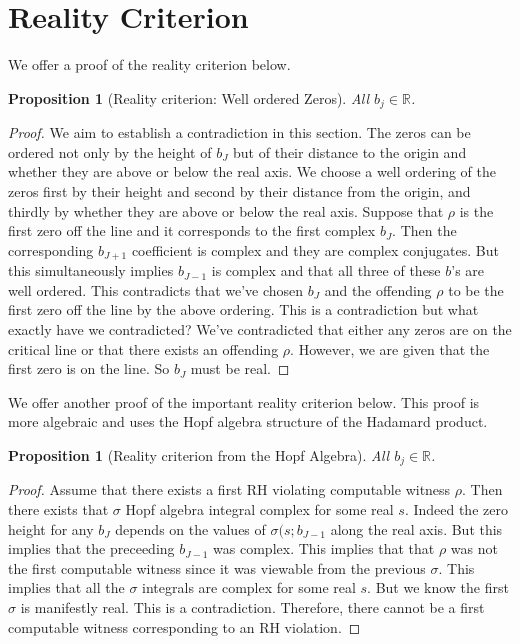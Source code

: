 \documentclass[12pt]{article}
\theoremstyle{plain}
\newtheorem{proposition}[theorem]{Proposition}
\theoremstyle{definition}
\newcommand{\R}{\mathbb{R}}
\begin{document}
\section{Reality Criterion}\label{sec:reality}
We offer a proof of the reality criterion below.
\begin{proposition}[Reality criterion: Well ordered Zeros]\label{prop:well-ordered}
  All $b_j \in \R$.
\end{proposition}
\begin{proof}
  We aim to establish a contradiction in this section. The zeros can be ordered not only by the height of $b_J$ but of their distance to the origin and whether they are above or below the real axis. We choose a well ordering of the zeros first by their height and second by their distance from the origin, and thirdly by whether they are above or below the real axis. 
  Suppose that $\rho$ is the first zero off the line and it corresponds to the first complex $b_J$. Then the corresponding $b_{J+1}$ coefficient is complex and they are complex conjugates. But this simultaneously implies $b_{J-1}$ is complex and that all three of these $b$'s are well ordered. 
  This contradicts that we've chosen $b_J$ and the offending $\rho$ to be the first zero off the line by the above ordering. This is a contradiction but what exactly have we contradicted? We've contradicted that either any zeros are on the critical line or that there exists an offending $\rho$.
  However, we are given that the first zero is on the line. So $b_J$ must be real.
\end{proof}
We offer another proof of the important reality criterion below. This proof is more algebraic and uses the Hopf algebra structure of the Hadamard product.
\begin{proposition}[Reality criterion from the Hopf Algebra]\label{prop:hopf_reality}
  All $b_j \in \R$.
\end{proposition}
\begin{proof}
  Assume that there exists a first RH violating computable witness $\rho$. Then there exists that $\sigma$ Hopf algebra integral complex for some real $s$. Indeed the zero height for any $b_J$ depends on the values of $\sigma(s;b_{J-1}$ along the real axis.
  But this implies that the preceeding $b_{J-1}$ was complex. This implies that that $\rho$ was not the first computable witness since it was viewable from the previous $\sigma$. This implies that all the $\sigma$ integrals are complex for some real $s$. But we know the first $\sigma$ is manifestly real. 
  This is a contradiction. Therefore, there cannot be a first computable witness corresponding to an RH violation. 
\end{proof}
\end{document}
